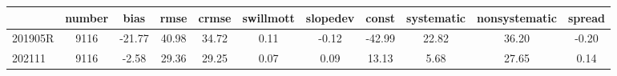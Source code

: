 \begin{tabular}{lcccccccccc}
\toprule
 & number & bias & rmse & crmse & swillmott & slopedev & const & systematic & nonsystematic & spread \\
\midrule
201905R & 9116 & -21.77 & 40.98 & 34.72 & 0.11 & -0.12 & -42.99 & 22.82 & 36.20 & -0.20 \\
202111 & 9116 & -2.58 & 29.36 & 29.25 & 0.07 & 0.09 & 13.13 & 5.68 & 27.65 & 0.14 \\
\bottomrule
\end{tabular}
